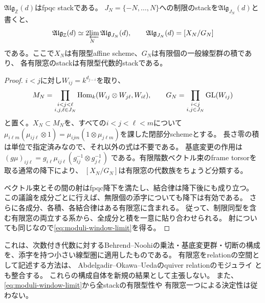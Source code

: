 \begin{proposition}[有限窓による厳密な表示]
\label{prop:moduli-finite-window}
$\mathfrak{Alg}_{\mathbb Z}(d)$はfpqc stackである。
$J_N=\{-N,\ldots,N\}$への制限のstackを$\mathfrak{Alg}_{J_N}(d)$と書くと、
\begin{equation}\label{eq:moduli-window-limit}
 \mathfrak{Alg}_{\mathbb Z}(d)
 \simeq \mathop{2\!\varprojlim}_{N}\mathfrak{Alg}_{J_N}(d),
 \qquad
 \mathfrak{Alg}_{J_N}(d)=[X_N/G_N]
\end{equation}
である。ここで$X_N$は有限型affine scheme、$G_N$は有限個の一般線型群の積であり、
各有限窓のstackは有限型代数的stackである。
\end{proposition}
\begin{proof}
$i<j$に対し$W_{ij}=k^{d_{j-i}}$を取り、
\[
 M_N=\prod_{\substack{i<j<\ell\\ i,j,\ell\in J_N}}
 \operatorname{Hom}_k(W_{ij}\otimes W_{j\ell},W_{i\ell}),\qquad
 G_N=\prod_{\substack{i<j\\ i,j\in J_N}}\mathrm{GL}(W_{ij})
\]
と置く。$X_N\subset M_N$を、すべての$i<j<\ell<m$について
$\mu_{i\ell m}(\mu_{ij\ell}\otimes1)
=\mu_{ijm}(1\otimes\mu_{j\ell m})$を課した閉部分schemeとする。
長さ零の積は単位で指定済みなので、それ以外の式は不要である。
基底変更の作用は
$(g\mu)_{ij\ell}=g_{i\ell}\mu_{ij\ell}(g_{ij}^{-1}\otimes g_{j\ell}^{-1})$
である。有限階数ベクトル束のframe torsorを取る通常の降下により、
$[X_N/G_N]$は有限窓の代数族をちょうど分類する。

ベクトル束とその間の射はfpqc降下を満たし、結合律は降下後にも成り立つ。
この議論を成分ごとに行えば、無限個の添字についても降下は有効である。
さらに各成分、各積、各結合律はある有限窓に含まれる。
従って、制限同型を含む有限窓の両立する系から、全成分と積を一意に貼り合わせられる。
射についても同じなので\eqref{eq:moduli-window-limit}を得る。
\end{proof}

これは、次数付き代数に対するBehrend--Noohiの乗法・基底変更群・切断の構成
\cite[\S\S2.3, 2.5]{BehrendNoohiModuli}を、添字を持つ小さい線型圏に適用したものである。
有限窓をrelationの空間として記述する方法は、
Abdelgadir--Okawa--Uedaのquiver relationのモジュライ
\cite[\S\S3--5]{AOUNCPlanes}とも整合する。
これらの構成自体を新規の結果として主張しない。
また、\eqref{eq:moduli-window-limit}から全stackの有限型性や
有限窓一つによる決定性は従わない。

